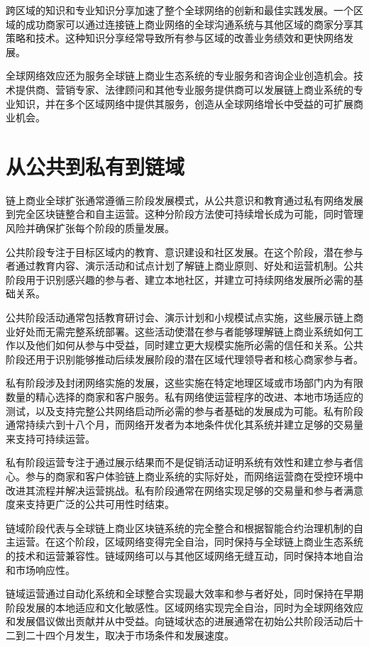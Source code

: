 \documentclass[
  Letterpaper,
]{scrbook}
\begin{document}
跨区域的知识和专业知识分享加速了整个全球网络的创新和最佳实践发展。一个区域的成功商家可以通过连接链上商业网络的全球沟通系统与其他区域的商家分享其策略和技术。这种知识分享经常导致所有参与区域的改善业务绩效和更快网络发展。

全球网络效应还为服务全球链上商业生态系统的专业服务和咨询企业创造机会。技术提供商、营销专家、法律顾问和其他专业服务提供商可以发展链上商业系统的专业知识，并在多个区域网络中提供其服务，创造从全球网络增长中受益的可扩展商业机会。

\section{从公共到私有到链域}\label{ux4eceux516cux5171ux5230ux79c1ux6709ux5230ux94feux57df}

链上商业全球扩张通常遵循三阶段发展模式，从公共意识和教育通过私有网络发展到完全区块链整合和自主运营。这种分阶段方法使可持续增长成为可能，同时管理风险并确保扩张每个阶段的质量发展。

公共阶段专注于目标区域内的教育、意识建设和社区发展。在这个阶段，潜在参与者通过教育内容、演示活动和试点计划了解链上商业原则、好处和运营机制。公共阶段用于识别感兴趣的参与者、建立本地社区，并建立可持续网络发展所必需的基础关系。

公共阶段活动通常包括教育研讨会、演示计划和小规模试点实施，这些展示链上商业好处而无需完整系统部署。这些活动使潜在参与者能够理解链上商业系统如何工作以及他们如何从参与中受益，同时建立更大规模实施所必需的信任和关系。公共阶段还用于识别能够推动后续发展阶段的潜在区域代理领导者和核心商家参与者。

私有阶段涉及封闭网络实施的发展，这些实施在特定地理区域或市场部门内为有限数量的精心选择的商家和客户服务。私有网络使运营程序的改进、本地市场适应的测试，以及支持完整公共网络启动所必需的参与者基础的发展成为可能。私有阶段通常持续六到十八个月，而网络开发者为本地条件优化其系统并建立足够的交易量来支持可持续运营。

私有阶段运营专注于通过展示结果而不是促销活动证明系统有效性和建立参与者信心。参与的商家和客户体验链上商业系统的实际好处，而网络运营商在受控环境中改进其流程并解决运营挑战。私有阶段通常在网络实现足够的交易量和参与者满意度来支持更广泛的公共可用性时结束。

链域阶段代表与全球链上商业区块链系统的完全整合和根据智能合约治理机制的自主运营。在这个阶段，区域网络变得完全自治，同时保持与全球链上商业生态系统的技术和运营兼容性。链域网络可以与其他区域网络无缝互动，同时保持本地自治和市场响应性。

链域运营通过自动化系统和全球整合实现最大效率和参与者好处，同时保持在早期阶段发展的本地适应和文化敏感性。区域网络实现完全自治，同时为全球网络效应和发展倡议做出贡献并从中受益。向链域状态的进展通常在初始公共阶段活动后十二到二十四个月发生，取决于市场条件和发展速度。
\end{document}
